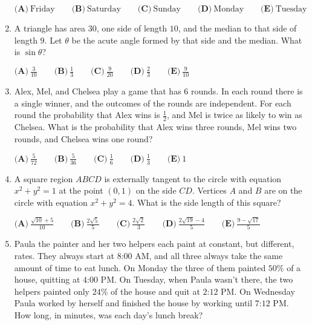 \documentclass{article}
\begin{document}
\begin{enumerate}[label=\arabic*., itemsep=0.5em]
\( \textbf{(A)}\ \text{Friday}
\qquad\textbf{(B)}\ \text{Saturday}
\qquad\textbf{(C)}\ \text{Sunday}
\qquad\textbf{(D)}\ \text{Monday}
\qquad\textbf{(E)}\ \text{Tuesday}
 \)\par \vspace{0.5em}\item A triangle has area \(30\), one side of length \(10\), and the median to that side of length \(9\).  Let \(\theta\) be the acute angle formed by that side and the median.  What is \(\sin{\theta}\)?

\( \textbf{(A)}\ \frac{3}{10}\qquad\textbf{(B)}\ \frac{1}{3}\qquad\textbf{(C)}\ \frac{9}{20}\qquad\textbf{(D)}\ \frac{2}{3}\qquad\textbf{(E)}\ \frac{9}{10} \)\par \vspace{0.5em}\item Alex, Mel, and Chelsea play a game that has \(6\) rounds.  In each round there is a single winner, and the outcomes of the rounds are independent.  For each round the probability that Alex wins is \(\frac{1}{2}\), and Mel is twice as likely to win as Chelsea.  What is the probability that Alex wins three rounds, Mel wins two rounds, and Chelsea wins one round?

\( \textbf{(A)}\ \frac{5}{72}\qquad\textbf{(B)}\ \frac{5}{36}\qquad\textbf{(C)}\ \frac{1}{6}\qquad\textbf{(D)}\ \frac{1}{3}\qquad\textbf{(E)}\ 1 \)\par \vspace{0.5em}\item A square region \(ABCD\) is externally tangent to the circle with equation \(x^2+y^2=1\) at the point \((0,1)\) on the side \(CD\).  Vertices \(A\) and \(B\) are on the circle with equation \(x^2+y^2=4\).  What is the side length of this square?

\( \textbf{(A)}\ \frac{\sqrt{10}+5}{10}\qquad\textbf{(B)}\ \frac{2\sqrt{5}}{5}\qquad\textbf{(C)}\ \frac{2\sqrt{2}}{3}\qquad\textbf{(D)}\ \frac{2\sqrt{19}-4}{5}\qquad\textbf{(E)}\ \frac{9-\sqrt{17}}{5} \)\par \vspace{0.5em}\item Paula the painter and her two helpers each paint at constant, but different, rates.  They always start at \(\text{8:00 AM}\), and all three always take the same amount of time to eat lunch.  On Monday the three of them painted \(50\%\) of a house, quitting at \(\text{4:00 PM}\).  On Tuesday, when Paula wasn't there, the two helpers painted only \(24\%\) of the house and quit at \(\text{2:12 PM}\).  On Wednesday Paula worked by herself and finished the house by working until \(\text{7:12 PM}\).  How long, in minutes, was each day's lunch break?


\end{enumerate}
\end{document}
